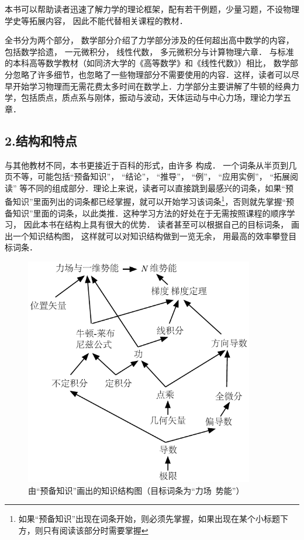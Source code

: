 本书可以帮助读者迅速了解力学的理论框架，配有若干例题，少量习题，不设物理学史等拓展内容， 因此不能代替相关课程的教材．

全书分为两个部分， 数学部分介绍了力学部分涉及的任何超出高中数学的内容， 包括数学拾遗， 一元微积分， 线性代数， 多元微积分与计算物理六章． 与标准的本科高等数学教材（如同济大学的《高等数学》和《线性代数》）相比， 数学部分忽略了许多细节，也忽略了一些物理部分不需要使用的内容．这样，读者可以尽早开始学习物理而无需花费太多时间在数学上．力学部分主要讲解了牛顿的经典力学，包括质点，质点系与刚体，振动与波动，天体运动与中心力场，理论力学五章．

\subsection{2.结构和特点}
与其他教材不同，本书更接近于百科的形式，由许多 构成． 一个词条从半页到几页不等，可能包括“预备知识”， “结论”， “推导”， “例”， “应用实例”， “拓展阅读” 等不同的组成部分．理论上来说，读者可以直接跳到最感兴的词条，如果“预备知识”里面列出的词条都已经掌握，就可以开始学习该词条\footnote{如果“预备知识”出现在词条开始，则必须先掌握，如果出现在某个小标题下方，则只有阅读该部分时需要掌握}，否则就先掌握“预备知识”里面的词条，以此类推．这种学习方法的好处在于无需按照课程的顺序学习， 因此本书在结构上具有很大的优势．  读者甚至可以根据自己的目标词条， 画出一个知识结构图， 这样就可以对知识结构做到一览无余， 用最高的效率攀登目标词条． %

\begin{figure}[ht]
\centering
\includegraphics[width=10cm]{./figures/flowchart_example.pdf}
\caption{由“预备知识”画出的知识结构图（目标词条为“力场\ 势能”）}
\end{figure}

